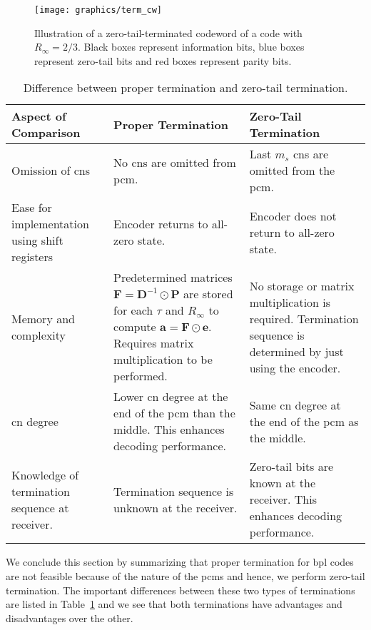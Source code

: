 \begin{figure}[htbp]
  \centering
  \texttt{[image: graphics/term\_cw]}
  \caption[Illustration of a zero-tail-terminated codeword.]{Illustration of a zero-tail-terminated codeword of a code with $R_\infty=2/3$. Black boxes represent information bits, blue boxes represent zero-tail bits and red boxes represent parity bits.}
  \label{fig:term_cw}
\end{figure}

\begin{table}[htbp]
  \centering
  \begin{tabular}{|p{5cm}|p{5cm}|p{5cm}|}
    \hline
    \textbf{Aspect of Comparison} &\textbf{Proper Termination} &\textbf{Zero-Tail Termination}\\
    \hline
    \hline
    Omission of \glspl{cn} &No \glspl{cn} are omitted from \gls{pcm}. &Last $m_s$ \glspl{cn} are omitted from the \gls{pcm}.\\
    \hline
    Ease for implementation using shift registers &Encoder returns to all-zero state. &Encoder does not return to all-zero state.\\
    \hline
    Memory and complexity &Predetermined matrices $\mathbf{F}=\mathbf{D}^{-1}\odot\mathbf{P}$ are stored for each $\tau$ and $R_\infty$ to compute $\mathbf{a}=\mathbf{F}\odot\mathbf{e}$. Requires matrix multiplication to be performed. &No storage or matrix multiplication is required. Termination sequence is determined by just using the encoder.\\
    \hline
    \gls{cn} degree &Lower \gls{cn} degree at the end of the \gls{pcm} than the middle. This enhances decoding performance. &Same \gls{cn} degree at the end of the \gls{pcm} as the middle.\\
    \hline
    Knowledge of termination sequence at receiver. &Termination sequence is unknown at the receiver. &Zero-tail bits are known at the receiver. This enhances decoding performance.\\
    \hline
  \end{tabular}
  \caption{Difference between proper termination and zero-tail termination.}
  \label{tab:diff_term}
\end{table}

We conclude this section by summarizing that proper termination for \gls{bpl} codes are not feasible because of the nature of the \glspl{pcm} and hence, we perform zero-tail termination. The important differences between these two types of terminations are listed in Table~\ref{tab:diff_term} and we see that both terminations have advantages and disadvantages over the other.